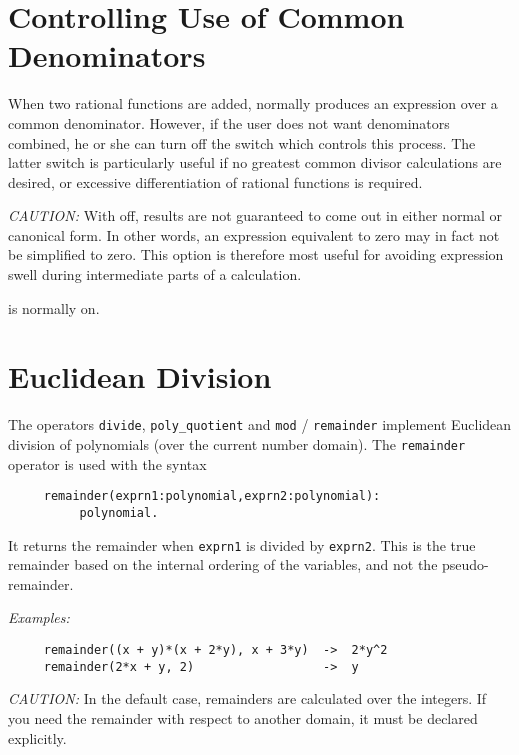 \section{Controlling Use of Common Denominators}
\hypertarget{switch:MCD}{}

When two rational functions are added, {\REDUCE} normally produces an
expression over a common denominator. However, if the user does not want
denominators combined, he or she can turn off the switch 
 which controls this process.  The latter switch is
particularly useful if no greatest common divisor calculations are
desired, or excessive differentiation of rational functions is required.

\textit{CAUTION:}  With  off, results are not guaranteed to come out in
either normal or canonical form.  In other words, an expression equivalent
to zero may in fact not be simplified to zero.  This option is therefore
most useful for avoiding expression swell during intermediate parts of a
calculation.

 is normally on.

\section{Euclidean Division}
\hypertarget{operator:DIVIDE}{}
\hypertarget{operator:POLY_QUOTIENT}{}
\hypertarget{operator:REMAINDER}{}
\hypertarget{operator:MOD}{}

The operators \texttt{divide}, \texttt{poly\_quotient} and
\texttt{mod} / \texttt{remainder} implement Euclidean division of
polynomials (over the current number domain).
The \texttt{remainder} operator is used with the syntax
\begin{verbatim}
     remainder(exprn1:polynomial,exprn2:polynomial):
          polynomial.
\end{verbatim}
It returns the remainder when \texttt{exprn1} is divided by \texttt{exprn2}.  This
is the true remainder based on the internal ordering of the variables, and
not the pseudo-remainder.

\textit{Examples:}
\begin{verbatim}
     remainder((x + y)*(x + 2*y), x + 3*y)  ->  2*y^2
     remainder(2*x + y, 2)                  ->  y
\end{verbatim}

\textit{CAUTION:} In the default case, remainders are calculated over the
integers.  If you need the remainder with respect to another domain, it
must be declared explicitly.

